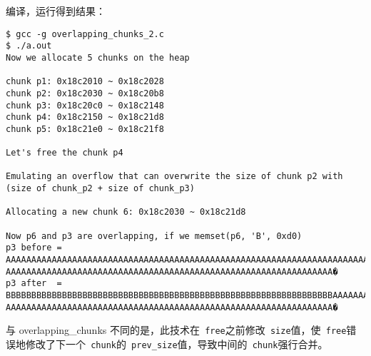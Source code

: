 编译，运行得到结果：
\begin{verbatim}
$ gcc -g overlapping_chunks_2.c
$ ./a.out 
Now we allocate 5 chunks on the heap

chunk p1: 0x18c2010 ~ 0x18c2028
chunk p2: 0x18c2030 ~ 0x18c20b8
chunk p3: 0x18c20c0 ~ 0x18c2148
chunk p4: 0x18c2150 ~ 0x18c21d8
chunk p5: 0x18c21e0 ~ 0x18c21f8

Let's free the chunk p4

Emulating an overflow that can overwrite the size of chunk p2 with (size of chunk_p2 + size of chunk_p3)

Allocating a new chunk 6: 0x18c2030 ~ 0x18c21d8

Now p6 and p3 are overlapping, if we memset(p6, 'B', 0xd0)
p3 before = AAAAAAAAAAAAAAAAAAAAAAAAAAAAAAAAAAAAAAAAAAAAAAAAAAAAAAAAAAAAAAAAAAAAAAAA
AAAAAAAAAAAAAAAAAAAAAAAAAAAAAAAAAAAAAAAAAAAAAAAAAAAAAAAAAAAAAAAA�
p3 after  = BBBBBBBBBBBBBBBBBBBBBBBBBBBBBBBBBBBBBBBBBBBBBBBBBBBBBBBBBBBBBBBBAAAAAAAA
AAAAAAAAAAAAAAAAAAAAAAAAAAAAAAAAAAAAAAAAAAAAAAAAAAAAAAAAAAAAAAAA�
\end{verbatim}

与 overlapping\_chunks 不同的是，此技术在\verb+ free+之前修改\verb+ size+值，使\verb+ free+错误地修改了下一个\verb+ chunk+的\verb+ prev_size+值，导致中间的\verb+ chunk+强行合并。
\newpage

